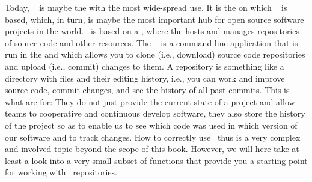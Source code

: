 %
%
Today, \git~\cite{S2023LG,T2024BGAGVCPMATFTND} is maybe the  with the most wide-spread use.
It is the  on which \github~\cite{PRGWSUdVLFTEKPKFBV2016TSRFTAOGAG,GH2025RD,S2021GAGCC} is based, which, in turn, is maybe the most important hub for open source software projects in the world.
\git\ is based on a , where the  hosts and manages repositories of source code and other resources.
The \git\  is a command line application that is run in the  and which allows you to clone (i.e., download) source code repositories and upload (i.e., commit) changes to them.
A repository is something like a directory with files and their editing history, i.e., you can work and improve source code, commit changes, and see the history of all past commits.
This is what  are for:
They do not just provide the current state of a project and allow teams to cooperative and continuous develop software, they also store the history of the project so as to enable us to see which code was used in which version of our software and to track changes.
How to correctly use \git\ thus is a very complex and involved topic beyond the scope of this book.
However, we will here take at least a look into a very small subset of functions that provide you a starting point for working with \git\ repositories.%
%
%
%
\endhsection%
